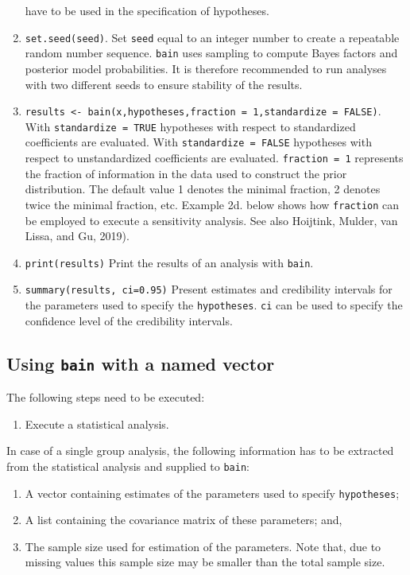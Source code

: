 \documentclass[
]{book}
\providecommand{\tightlist}{%
  \setlength{\itemsep}{0pt}\setlength{\parskip}{0pt}}
\begin{document}
\begin{enumerate}
  have to be used in the specification of hypotheses.
\item
  \texttt{set.seed(seed)}. Set \texttt{seed} equal to an integer
  number to create a repeatable random number sequence. \texttt{bain} uses sampling to compute Bayes factors and posterior model probabilities. It is therefore recommended to run analyses with two different seeds to ensure stability of the results.
\item
  \texttt{results\ \textless{}-\ bain(x,hypotheses,fraction\ =\ 1,standardize\ =\ FALSE)}.
  With \texttt{standardize\ =\ TRUE} hypotheses with respect
  to standardized coefficients are evaluated. With \texttt{standardize\ =\ FALSE} hypotheses with respect to unstandardized coefficients
  are evaluated. \texttt{fraction\ =\ 1} represents the fraction of information in the data used to construct the prior distribution. The default value 1 denotes the minimal fraction, 2 denotes twice the minimal fraction, etc. Example 2d. below shows how \texttt{fraction} can be employed to execute a sensitivity analysis. See also Hoijtink, Mulder, van Lissa, and Gu, 2019).
\item
  \texttt{print(results)} Print the results of an analysis with
  \texttt{bain}.
\item
  \texttt{summary(results,\ ci=0.95)} Present estimates and credibility intervals for the parameters used to specify the \texttt{hypotheses}. \texttt{ci} can be used to specify the confidence level of the credibility intervals.
\end{enumerate}

\hypertarget{using-bain-with-a-named-vector}{%
\subsection{\texorpdfstring{Using \texttt{bain} with a named vector}{Using bain with a named vector}}\label{using-bain-with-a-named-vector}}

The following steps need to be executed:

\begin{enumerate}
\def\labelenumi{\arabic{enumi})}
\tightlist
\item
  Execute a statistical analysis.
\end{enumerate}

In case of a single group analysis, the
following information has to be extracted from the statistical analysis and
supplied to \texttt{bain}:

\begin{enumerate}
\def\labelenumi{\alph{enumi})}
\tightlist
\item
  A vector containing estimates of the parameters
  used to specify \texttt{hypotheses};
\item
  A list containing the covariance matrix of these parameters; and,
\item
  The sample size used for estimation of the parameters. Note that,
  due to missing values this sample size may be smaller than the total sample
  size.
\end{enumerate}
\end{document}
